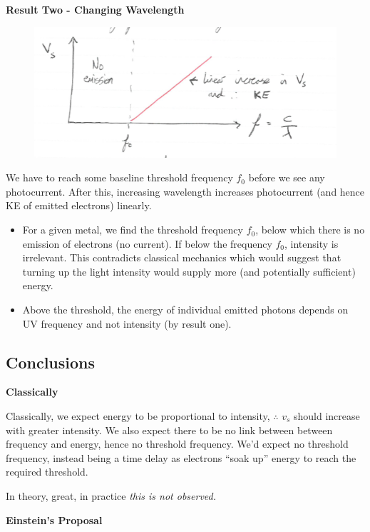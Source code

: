 \textbf{Result Two - Changing Wavelength}
\begin{figure}[H]
    \centering
    \includegraphics{figures/lec03-04.png}
    \caption{}
\end{figure}

We have to reach some baseline threshold frequency $f_0$ before we see any photocurrent. After this, increasing wavelength increases photocurrent (and hence KE of emitted electrons) linearly.

\begin{itemize}
    \item For a given metal, we find the threshold frequency $f_0$, below which there is no emission of electrons (no current). If below the frequency $f_0$, intensity is irrelevant. This contradicts classical mechanics which would suggest that turning up the light intensity would supply more (and potentially sufficient) energy.
    \item Above the threshold, the energy of individual emitted photons depends on UV frequency and not intensity (by result one).
\end{itemize}

\subsection*{Conclusions}

\textbf{Classically}

Classically, we expect energy to be proportional to intensity, $\therefore$ $v_s$ should increase with greater intensity. We also expect there to be no link between between frequency and energy, hence no threshold frequency. We'd expect no threshold frequency, instead being a time delay as electrons ``soak up'' energy to reach the required threshold.

In theory, great, in practice \emph{this is not observed.}

\textbf{Einstein's Proposal}

